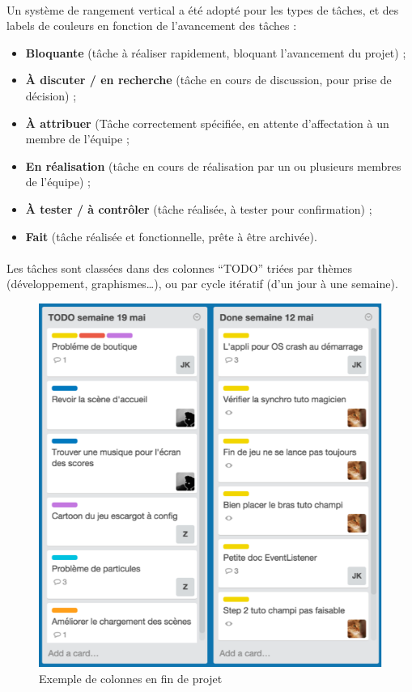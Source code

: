 \paragraph{}
Un système de rangement vertical a été adopté pour les types de tâches, et des labels de couleurs en fonction de l’avancement des tâches :

\begin{itemize}
\item \textbf{Bloquante} (tâche à réaliser rapidement, bloquant l’avancement du projet) ;
\item \textbf{À discuter / en recherche} (tâche en cours de discussion, pour prise de décision) ;
\item \textbf{À attribuer} (Tâche correctement spécifiée, en attente d’affectation à un membre de l’équipe ;
\item \textbf{En réalisation} (tâche en cours de réalisation par un ou plusieurs membres de l’équipe) ;
\item \textbf{À tester / à contrôler} (tâche réalisée, à tester pour confirmation) ;
\item \textbf{Fait} (tâche réalisée et fonctionnelle, prête à être archivée).
\end{itemize}

\paragraph{}
Les tâches sont classées dans des colonnes “TODO” triées par thèmes (développement, graphismes…), ou par cycle itératif (d’un jour à une semaine).

\begin{figure}[H]\centering
  \includegraphics[scale=1]{./img/trello.png}
  \caption{Exemple de colonnes en fin de projet}
  \label{trelloc}
\end{figure}

